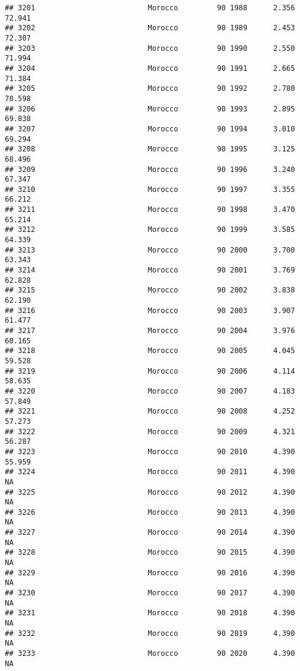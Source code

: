 \documentclass[
]{article}
\begin{document}
\begin{verbatim}
## 3201                          Morocco         90 1988      2.356     72.941
## 3202                          Morocco         90 1989      2.453     72.307
## 3203                          Morocco         90 1990      2.550     71.994
## 3204                          Morocco         90 1991      2.665     71.384
## 3205                          Morocco         90 1992      2.780     70.598
## 3206                          Morocco         90 1993      2.895     69.838
## 3207                          Morocco         90 1994      3.010     69.294
## 3208                          Morocco         90 1995      3.125     68.496
## 3209                          Morocco         90 1996      3.240     67.347
## 3210                          Morocco         90 1997      3.355     66.212
## 3211                          Morocco         90 1998      3.470     65.214
## 3212                          Morocco         90 1999      3.585     64.339
## 3213                          Morocco         90 2000      3.700     63.343
## 3214                          Morocco         90 2001      3.769     62.828
## 3215                          Morocco         90 2002      3.838     62.190
## 3216                          Morocco         90 2003      3.907     61.477
## 3217                          Morocco         90 2004      3.976     60.165
## 3218                          Morocco         90 2005      4.045     59.528
## 3219                          Morocco         90 2006      4.114     58.635
## 3220                          Morocco         90 2007      4.183     57.849
## 3221                          Morocco         90 2008      4.252     57.273
## 3222                          Morocco         90 2009      4.321     56.287
## 3223                          Morocco         90 2010      4.390     55.959
## 3224                          Morocco         90 2011      4.390         NA
## 3225                          Morocco         90 2012      4.390         NA
## 3226                          Morocco         90 2013      4.390         NA
## 3227                          Morocco         90 2014      4.390         NA
## 3228                          Morocco         90 2015      4.390         NA
## 3229                          Morocco         90 2016      4.390         NA
## 3230                          Morocco         90 2017      4.390         NA
## 3231                          Morocco         90 2018      4.390         NA
## 3232                          Morocco         90 2019      4.390         NA
## 3233                          Morocco         90 2020      4.390         NA

\end{verbatim}
\end{document}
